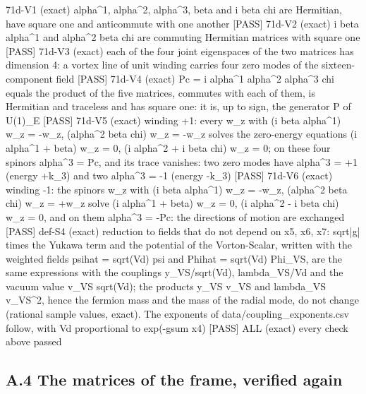 \documentclass[
  10pt,
]{article}
\newenvironment{Shaded}{}{}
\newcommand{\NormalTok}[1]{#1}
\begin{document}
\begin{Shaded}
\begin{Highlighting}[]
\NormalTok{[PASS] 71d{-}V1  (exact) alpha\^{}1, alpha\^{}2, alpha\^{}3, beta and i beta chi are Hermitian, have square one and anticommute with one another}
\NormalTok{[PASS] 71d{-}V2  (exact) i beta alpha\^{}1 and alpha\^{}2 beta chi are commuting Hermitian matrices with square one}
\NormalTok{[PASS] 71d{-}V3  (exact) each of the four joint eigenspaces of the two matrices has dimension 4: a vortex line of unit winding carries four zero modes of the sixteen{-}component field}
\NormalTok{[PASS] 71d{-}V4  (exact) Pc = i alpha\^{}1 alpha\^{}2 alpha\^{}3 chi equals the product of the five matrices, commutes with each of them, is Hermitian and traceless and has square one: it is, up to sign, the generator P of U(1)\_E}
\NormalTok{[PASS] 71d{-}V5  (exact) winding +1: every w\_z with (i beta alpha\^{}1) w\_z = {-}w\_z, (alpha\^{}2 beta chi) w\_z = {-}w\_z solves the zero{-}energy equations (i alpha\^{}1 + beta) w\_z = 0, (i alpha\^{}2 + i beta chi) w\_z = 0; on these four spinors alpha\^{}3 = Pc, and its trace vanishes: two zero modes have alpha\^{}3 = +1 (energy +k\_3) and two alpha\^{}3 = {-}1 (energy {-}k\_3)}
\NormalTok{[PASS] 71d{-}V6  (exact) winding {-}1: the spinors w\_z with (i beta alpha\^{}1) w\_z = {-}w\_z, (alpha\^{}2 beta chi) w\_z = +w\_z solve (i alpha\^{}1 + beta) w\_z = 0, (i alpha\^{}2 {-} i beta chi) w\_z = 0, and on them alpha\^{}3 = {-}Pc: the directions of motion are exchanged}
\NormalTok{[PASS] def{-}S4  (exact) reduction to fields that do not depend on x5, x6, x7: sqrt|g| times the Yukawa term and the potential of the Vorton{-}Scalar, written with the weighted fields psihat = sqrt(Vd) psi and Phihat = sqrt(Vd) Phi\_VS, are the same expressions with the couplings y\_VS/sqrt(Vd), lambda\_VS/Vd and the vacuum value v\_VS sqrt(Vd); the products y\_VS v\_VS and lambda\_VS v\_VS\^{}2, hence the fermion mass and the mass of the radial mode, do not change (rational sample values, exact). The exponents of data/coupling\_exponents.csv follow, with Vd proportional to exp({-}gsum x4)}
\NormalTok{[PASS] ALL  (exact) every check above passed}
\end{Highlighting}
\end{Shaded}

\hypertarget{a.4-the-matrices-of-the-frame-verified-again}{%
\subsection{A.4 The matrices of the frame, verified
again}\label{a.4-the-matrices-of-the-frame-verified-again}}
\end{document}

